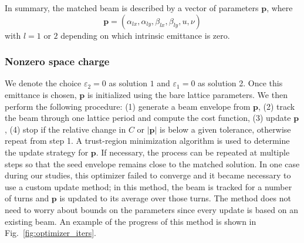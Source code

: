 %
In summary, the matched beam is described by a vector of parameters $\mathbf{p}$, where
%
\begin{equation} \label{eq:twiss_params_4D}
    \mathbf{p} = (\alpha_{lx}, \alpha_{ly}, \beta_{lx}, \beta_{ly}, u, \nu)
\end{equation}
%
with $l = 1$ or $2$ depending on which intrinsic emittance is zero.



\subsubsection{Nonzero space charge}

We denote the choice $\varepsilon_2 = 0$ as solution $1$ and $\varepsilon_1 = 0$ as solution 2. Once this emittance is chosen, $\mathbf{p}$ is initialized using the bare lattice parameters. We then perform the following procedure: (1) generate a beam envelope from $\mathbf{p}$, (2) track the beam through one lattice period and compute the cost function, (3) update $\mathbf{p}$, (4) stop if the relative change in $C$ or $|\mathbf{p}|$ is below a given tolerance, otherwise repeat from step 1. A trust-region minimization algorithm \cite{Branch1999} is used to determine the update strategy for $\mathbf{p}$. If necessary, the process can be repeated at multiple steps so that the seed envelope remains close to the matched solution. In one case during our studies, this optimizer failed to converge and it became necessary to use a custom update method; in this method, the beam is tracked for a number of turns and $\mathbf{p}$ is updated to its average over those turns. The method does not need to worry about bounds on the parameters since every update is based on an existing beam. An example of the progress of this method is shown in Fig.~\ref{fig:optimizer_iters}. 

